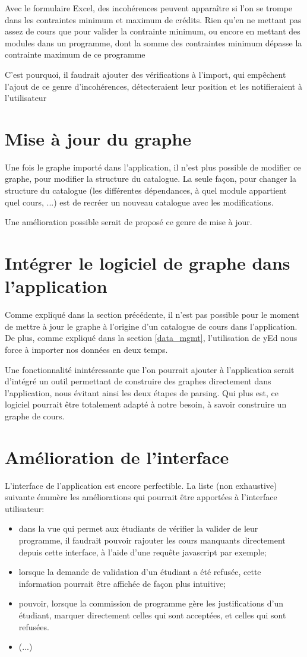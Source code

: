 Avec le formulaire Excel, des incohérences peuvent apparaître si l'on se trompe dans les contraintes minimum et maximum de crédits. Rien qu'en ne mettant pas assez de cours que pour valider la contrainte minimum, ou encore en mettant des modules dans un programme, dont la somme des contraintes minimum dépasse la contrainte maximum de ce programme

C'est pourquoi, il faudrait ajouter des vérifications à l'import, qui empêchent l'ajout de ce genre d'incohérences, détecteraient leur position et les notifieraient  à l'utilisateur

\section{Mise à jour du graphe}
Une fois le graphe importé dans l'application, il n'est plus possible de modifier ce graphe, pour modifier la structure du catalogue. La seule façon, pour changer la structure du catalogue (les différentes dépendances, à quel module appartient quel cours, ...) est de recréer un nouveau catalogue avec les modifications.

Une amélioration possible serait de proposé ce genre de mise à jour.

\section{Intégrer le logiciel de graphe dans l'application}
Comme expliqué dans la section précédente, il n'est pas possible pour le moment de mettre à jour le graphe à l'origine d'un catalogue de cours dans l'application. De plus, comme expliqué dans la section \ref{data_mgmt}, l'utilisation de yEd nous force à importer nos données en deux temps.

Une fonctionnalité inintéressante que l'on pourrait ajouter à l'application serait d'intégré un outil permettant de construire des graphes directement dans l'application, nous évitant ainsi les deux étapes de parsing. Qui plus est, ce logiciel pourrait être totalement adapté à notre besoin, à savoir construire un graphe de cours.    
\section{Amélioration de l'interface} 
L'interface de l'application est encore perfectible. La liste (non exhaustive) suivante énumère les améliorations qui pourrait être apportées à l'interface utilisateur:
\begin{itemize}
\item dans la vue qui permet aux étudiants de vérifier la valider de leur programme, il faudrait pouvoir rajouter les cours manquants directement depuis cette interface, à l'aide d'une requête javascript par exemple;
\item lorsque la demande de validation d'un étudiant a été refusée, cette information pourrait être affichée de façon plus intuitive;
\item pouvoir, lorsque la commission de programme gère les justifications d'un étudiant, marquer directement celles qui sont acceptées, et celles qui sont refusées.
\item (...)
\end{itemize}

